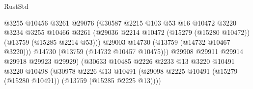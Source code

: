 \begin{lexlean}{RustStd}
\begin{coremodule}
                                            @3255
                                            @10456
                                            @3261
                                            @29076
                                            (@30587
                                              @2215
                                              @103
                                              @53
                                              @16
                                              @10472
                                              @3220
                                              @3234
                                              @3255
                                              @10466
                                              @3261
                                              (@29036
                                                @2214
                                                @10472
                                                (@15279 (@15280 @10472))
                                                (@13759 (@15285 @2214 @53)))
                                              @29003
                                              @14730
                                              (@13759 (@14732 @10467 @3220)))
                                            @14730
                                            (@13759 (@14732 @10457 @10475)))
                                          @29908
                                          @29911
                                          @29914
                                          @29918
                                          @29923
                                          @29929)
                                        (@30633
                                          @10485
                                          @2226
                                          @2233
                                          @13
                                          @3220
                                          @10491
                                          @3220
                                          @10498
                                          (@30978
                                            @2226
                                            @13
                                            @10491
                                            (@29098
                                              @2225
                                              @10491
                                              (@15279 (@15280 @10491))
                                              (@13759 (@15285 @2225 @13))))

\end{coremodule}
\end{lexlean}
